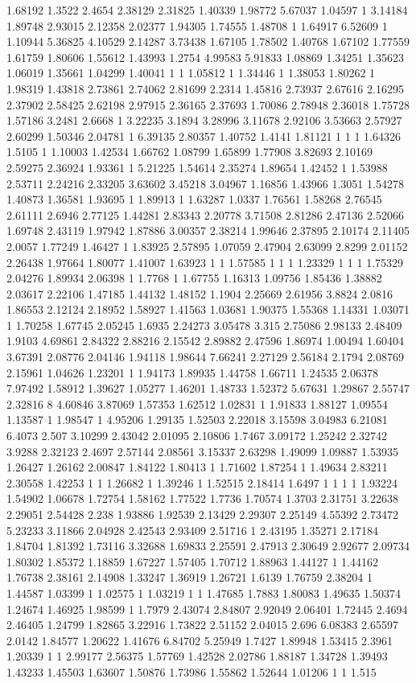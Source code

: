 1.68192 1.3522 2.4654 2.38129 2.31825 1.40339 1.98772 5.67037 1.04597 1 3.14184 1.89748 2.93015 2.12358 2.02377 1.94305 1.74555 1.48708 1 1.64917 6.52609 1 1.10944 5.36825 4.10529 2.14287 3.73438 1.67105 1.78502 1.40768 1.67102 1.77559 1.61759 1.80606 1.55612 1.43993 1.2754 4.99583 5.91833 1.08869 1.34251 1.35623 1.06019 1.35661 1.04299 1.40041 1 1 1.05812 1 1.34446 1 1.38053 1.80262 1 1.98319 1.43818 2.73861 2.74062 2.81699 2.2314 1.45816 2.73937 2.67616 2.16295 2.37902 2.58425 2.62198 2.97915 2.36165 2.37693 1.70086 2.78948 2.36018 1.75728 1.57186 3.2481 2.6668 1 3.22235 3.1894 3.28996 3.11678 2.92106 3.53663 2.57927 2.60299 1.50346 2.04781 1 6.39135 2.80357 1.40752 1.4141 1.81121 1 1 1 1.64326 1.5105 1 1.10003 1.42534 1.66762 1.08799 1.65899 1.77908 3.82693 2.10169 2.59275 2.36924 1.93361 1 5.21225 1.54614 2.35274 1.89654 1.42452 1 1.53988 2.53711 2.24216 2.33205 3.63602 3.45218 3.04967 1.16856 1.43966 1.3051 1.54278 1.40873 1.36581 1.93695 1 1.89913 1 1.63287 1.0337 1.76561 1.58268 2.76545 2.61111 2.6946 2.77125 1.44281 2.83343 2.20778 3.71508 2.81286 2.47136 2.52066 1.69748 2.43119 1.97942 1.87886 3.00357 2.38214 1.99646 2.37895 2.10174 2.11405 2.0057 1.77249 1.46427 1 1.83925 2.57895 1.07059 2.47904 2.63099 2.8299 2.01152 2.26438 1.97664 1.80077 1.41007 1.63923 1 1 1.57585 1 1 1 1.23329 1 1 1 1.75329 2.04276 1.89934 2.06398 1 1.7768 1 1.67755 1.16313 1.09756 1.85436 1.38882 2.03617 2.22106 1.47185 1.44132 1.48152 1.1904 2.25669 2.61956 3.8824 2.0816 1.86553 2.12124 2.18952 1.58927 1.41563 1.03681 1.90375 1.55368 1.14331 1.03071 1 1.70258 1.67745 2.05245 1.6935 2.24273 3.05478 3.315 2.75086 2.98133 2.48409 1.9103 4.69861 2.84322 2.88216 2.15542 2.89882 2.47596 1.86974 1.00494 1.60404 3.67391 2.08776 2.04146 1.94118 1.98644 7.66241 2.27129 2.56184 2.1794 2.08769 2.15961 1.04626 1.23201 1 1.94173 1.89935 1.44758 1.66711 1.24535 2.06378 7.97492 1.58912 1.39627 1.05277 1.46201 1.48733 1.52372 5.67631 1.29867 2.55747 2.32816 8 4.60846 3.87069 1.57353 1.62512 1.02831 1 1.91833 1.88127 1.09554 1.13587 1 1.98547 1 4.95206 1.29135 1.52503 2.22018 3.15598 3.04983 6.21081 6.4073 2.507 3.10299 2.43042 2.01095 2.10806 1.7467 3.09172 1.25242 2.32742 3.9288 2.32123 2.4697 2.57144 2.08561 3.15337 2.63298 1.49099 1.09887 1.53935 1.26427 1.26162 2.00847 1.84122 1.80413 1 1.71602 1.87254 1 1.49634 2.83211 2.30558 1.42253 1 1 1.26682 1 1.39246 1 1.52515 2.18414 1.6497 1 1 1 1 1.93224 1.54902 1.06678 1.72754 1.58162 1.77522 1.7736 1.70574 1.3703 2.31751 3.22638 2.29051 2.54428 2.238 1.93886 1.92539 2.13429 2.29307 2.25149 4.55392 2.73472 5.23233 3.11866 2.04928 2.42543 2.93409 2.51716 1 2.43195 1.35271 2.17184 1.84704 1.81392 1.73116 3.32688 1.69833 2.25591 2.47913 2.30649 2.92677 2.09734 1.80302 1.85372 1.18859 1.67227 1.57405 1.70712 1.88963 1.44127 1 1.44162 1.76738 2.38161 2.14908 1.33247 1.36919 1.26721 1.6139 1.76759 2.38204 1 1.44587 1.03399 1 1.02575 1 1.03219 1 1 1.47685 1.7883 1.80083 1.49635 1.50374 1.24674 1.46925 1.98599 1 1.7979 2.43074 2.84807 2.92049 2.06401 1.72445 2.4694 2.46405 1.24799 1.82865 3.22916 1.73822 2.51152 2.04015 2.696 6.08383 2.65597 2.0142 1.84577 1.20622 1.41676 6.84702 5.25949 1.7427 1.89948 1.53415 2.3961 1.20339 1 1 2.99177 2.56375 1.57769 1.42528 2.02786 1.88187 1.34728 1.39493 1.43233 1.45503 1.63607 1.50876 1.73986 1.55862 1.52644 1.01206 1 1 1.515 